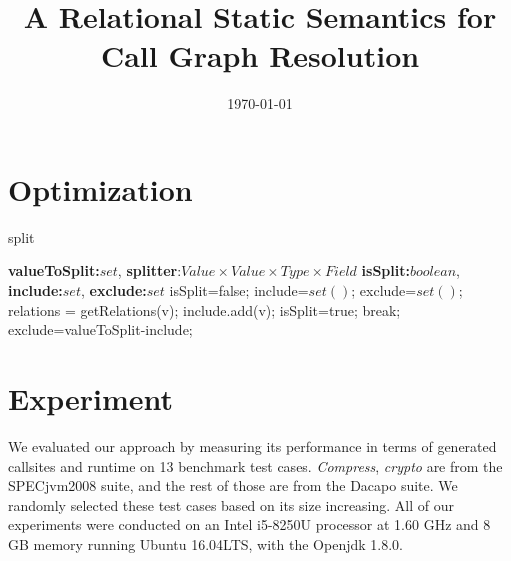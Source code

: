 \documentclass{llncs}
\title{A Relational Static Semantics for Call Graph Resolution}
\author{\today}
\institute{Jinan University}
\begin{document}
\maketitle


\section{Optimization}\label{sec:optimization}
\begin{algorithm}
\caption{split}
\label{alg:split}
\begin{algorithmic}
\REQUIRE \textbf{valueToSplit:}$set$, \textbf{splitter}:$Value \times Value \times Type \times Field$
\ENSURE \textbf{isSplit:}$boolean$, \textbf{include:}$set$, \textbf{exclude:}$set$
\STATE isSplit=false;
\STATE include=$set()$;
\STATE exclude=$set()$;
\STATE relations = getRelations(v);		
\STATE include.add(v);
\STATE isSplit=true;
\STATE break;
\ENDIF
\ENDFOR
\ENDFOR
{}
	\STATE exclude=valueToSplit-include;
\ENDIF

\end{algorithmic}
\end{algorithm}

\section{Experiment}\label{sec:experiment}
We evaluated our approach by measuring its performance in terms of generated callsites and runtime on 13 benchmark test cases. \textit{Compress}, \textit{crypto} are from the SPECjvm2008 suite, and the rest of those are from the Dacapo suite. We randomly selected these test cases based on its size increasing.
All of our experiments were conducted on an Intel i5-8250U processor at 1.60 GHz and 8 GB memory running Ubuntu 16.04LTS, with the Openjdk 1.8.0.
\end{document}

